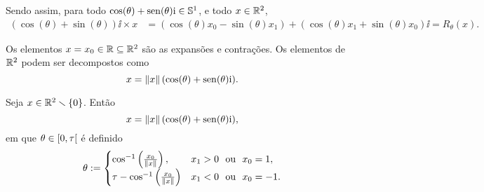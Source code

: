 Sendo assim, para todo $\cos(\theta) + \operatorname{sen}(\theta) \mathrm{i} \in \mathbb{S}^1$, e todo $x \in \mathbb{R}^2$,
	\begin{align*}
	(\cos(\theta) + \sin(\theta)) \ii \times x &= (\cos(\theta)x_0-\sin(\theta)x_1) +(\cos(\theta)x_1+\sin(\theta)x_0) \ii = R_\theta(x).
	\end{align*}

Os elementos $x = x_0 \in \mathbb{R} \subseteq \mathbb{R}^2$ são as expansões e contrações. Os elementos de $\mathbb{R}^2$ podem ser decompostos como
	\begin{equation*}
	x = \left\Vert{x}\right\Vert(\cos(\theta) + \operatorname{sen}(\theta) \mathrm{i}).
	\end{equation*}

\begin{proposition}
Seja $x \in \mathbb{R}^2 \smallsetminus \{0\}$. Então
	\begin{equation*}
	x = \left\Vert{x}\right\Vert(\cos(\theta) + \operatorname{sen}(\theta) \mathrm{i}),
	\end{equation*}
em que $\theta \in \left[{0},{\tau}\right[$ é definido
	\begin{equation*}
	\theta :=	\begin{cases}
				\cos\inv\left(\frac{x_0}{\nor{x}}\right),			& x_1 > 0 \text{\ \ ou\ \ } x_0 = 1, \\
				\tau - \cos\inv\left(\frac{x_0}{\nor{x}}\right)		& x_1 < 0 \text{\ \ ou\ \ } x_0 = -1.
				\end{cases}
	\end{equation*}
\end{proposition}
